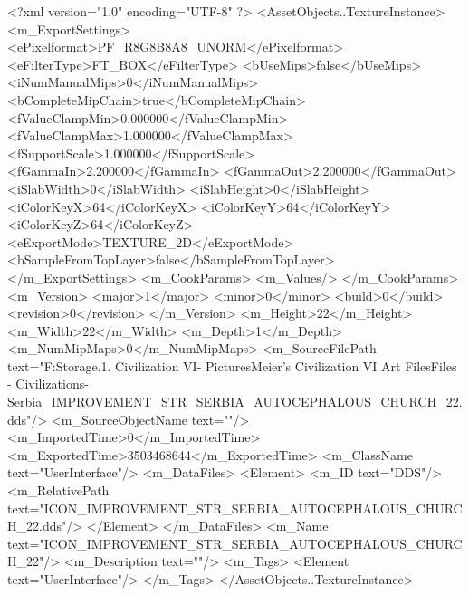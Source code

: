 <?xml version="1.0" encoding="UTF-8" ?>
<AssetObjects..TextureInstance>
	<m_ExportSettings>
		<ePixelformat>PF_R8G8B8A8_UNORM</ePixelformat>
		<eFilterType>FT_BOX</eFilterType>
		<bUseMips>false</bUseMips>
		<iNumManualMips>0</iNumManualMips>
		<bCompleteMipChain>true</bCompleteMipChain>
		<fValueClampMin>0.000000</fValueClampMin>
		<fValueClampMax>1.000000</fValueClampMax>
		<fSupportScale>1.000000</fSupportScale>
		<fGammaIn>2.200000</fGammaIn>
		<fGammaOut>2.200000</fGammaOut>
		<iSlabWidth>0</iSlabWidth>
		<iSlabHeight>0</iSlabHeight>
		<iColorKeyX>64</iColorKeyX>
		<iColorKeyY>64</iColorKeyY>
		<iColorKeyZ>64</iColorKeyZ>
		<eExportMode>TEXTURE_2D</eExportMode>
		<bSampleFromTopLayer>false</bSampleFromTopLayer>
	</m_ExportSettings>
	<m_CookParams>
		<m_Values/>
	</m_CookParams>
	<m_Version>
		<major>1</major>
		<minor>0</minor>
		<build>0</build>
		<revision>0</revision>
	</m_Version>
	<m_Height>22</m_Height>
	<m_Width>22</m_Width>
	<m_Depth>1</m_Depth>
	<m_NumMipMaps>0</m_NumMipMaps>
	<m_SourceFilePath text="F:\Mod Storage\2.1. Civilization VI\Mods\Archive - Pictures\Sid Meier's Civilization VI Art Files\Art Files - Civilizations\Civilization - Serbia\ICON_IMPROVEMENT_STR_SERBIA_AUTOCEPHALOUS_CHURCH_22.dds"/>
	<m_SourceObjectName text=""/>
	<m_ImportedTime>0</m_ImportedTime>
	<m_ExportedTime>3503468644</m_ExportedTime>
	<m_ClassName text="UserInterface"/>
	<m_DataFiles>
		<Element>
			<m_ID text="DDS"/>
			<m_RelativePath text="ICON_IMPROVEMENT_STR_SERBIA_AUTOCEPHALOUS_CHURCH_22.dds"/>
		</Element>
	</m_DataFiles>
	<m_Name text="ICON_IMPROVEMENT_STR_SERBIA_AUTOCEPHALOUS_CHURCH_22"/>
	<m_Description text=""/>
	<m_Tags>
		<Element text="UserInterface"/>
	</m_Tags>
</AssetObjects..TextureInstance>

